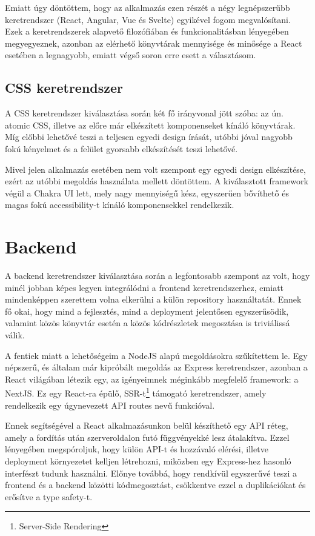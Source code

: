 Emiatt úgy döntöttem, hogy az alkalmazás ezen részét a négy legnépszerűbb keretrendszer (React, Angular, Vue és Svelte) egyikével fogom megvalósítani.
Ezek a keretrendszerek alapvető filozófiában és funkcionalitásban lényegében megyegyeznek, azonban az elérhető könyvtárak mennyisége és minősége a React esetében a legnagyobb, emiatt végső soron erre esett a választásom. \cite{React}

\subsection{CSS keretrendszer}
A CSS keretrendszer kiválasztása során két fő irányvonal jött szóba: az ún. atomic CSS, illetve az előre már elkészített komponenseket kínáló könyvtárak.
Míg előbbi lehetővé teszi a teljesen egyedi design írását, utóbbi jóval nagyobb fokú kényelmet és a felület gyorsabb elkészítését teszi lehetővé.

Mivel jelen alkalmazás esetében nem volt szempont egy egyedi design elkészítése, ezért az utóbbi megoldás használata mellett döntöttem.
A kiválasztott framework végül a Chakra UI lett, mely nagy mennyiségű kész, egyszerűen bővíthető és magas fokú accessibility-t kínáló komponensekkel rendelkezik. \cite{ChakraUI}

\section{Backend}
A backend keretrendszer kiválasztása során a legfontosabb szempont az volt, hogy minél jobban képes legyen integrálódni a frontend keretrendszerhez,
emiatt mindenképpen szerettem volna elkerülni a külön repository használtatát.
Ennek fő okai, hogy mind a fejlesztés, mind a deployment jelentősen egyszerűsödik, valamint közös könyvtár esetén a közös kódrészletek megosztása is triviálissá válik.

A fentiek miatt a lehetőségeim a NodeJS alapú megoldásokra szűkítettem le. Egy népszerű, és általam már kipróbált megoldás az Express keretrendszer, azonban a React világában létezik egy, az igényeimnek méginkább megfelelő framework: a NextJS.
Ez egy React-ra épülő, SSR-t\footnote{Server-Side Rendering} támogató keretrendszer, amely rendelkezik egy úgynevezett API routes nevű funkcióval.

Ennek segítségével a React alkalmazásunkon belül készíthető egy API réteg, amely a fordítás után szerveroldalon futó függvényekké lesz átalakítva.
Ezzel lényegében megspóroljuk, hogy külön API-t és hozzávaló elérési, illetve deployment környezetet kelljen létrehozni, miközben egy Express-hez hasonló interfészt tudunk használni.
Előnye továbbá, hogy rendkívül egyszerűvé teszi a frontend és a backend közötti kódmegosztást, csökkentve ezzel a duplikációkat és erősítve a type safety-t.\cite{NextJS}

